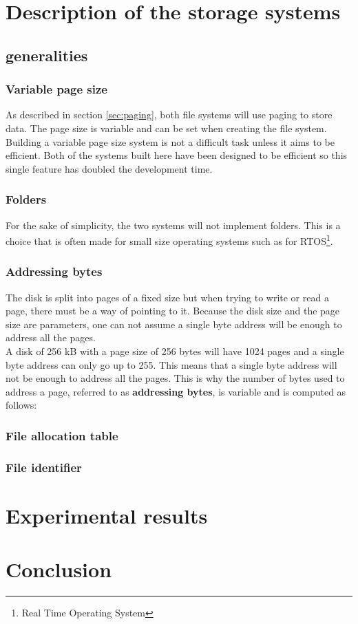 \documentclass[10pt,a4paper]{ULBreport}
\begin{document}
\chapter{Description of the storage systems}

\section{generalities}
\subsection{Variable page size}
As described in section \ref{sec:paging}, both file systems will use paging to store data. The page size is variable and can be set when creating the file system. Building a variable page size system is not a difficult task unless it aims to be efficient. Both of the systems built here have been designed to be efficient so this single feature has doubled the development time.
\subsection{Folders}
For the sake of simplicity, the two systems will not implement folders. This is a choice that is often made for small size operating systems such as for RTOS\footnote{Real Time Operating System}.
\subsection{Addressing bytes}
The disk is split into pages of a fixed size but when trying to write or read a page, there must be a way of pointing to it. Because the disk size and the page size are parameters, one can not assume a single byte address will be enough to address all the pages. \\
A disk of 256 kB with a page size of 256 bytes will have 1024 pages and a single byte address can only go up to 255. This means that a single byte address will not be enough to address all the pages. This is why the number of bytes used to address a page, referred to as \textbf{addressing bytes}, is variable and is computed as follows:

\subsection{File allocation table}
\subsection{File identifier}








\chapter{Experimental results}







\chapter{Conclusion}



\end{document}
